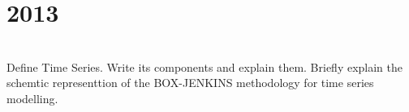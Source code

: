 \section*{2013}
\vspace{-.5cm}
\hrulefill \smallskip\\
 Define Time Series. Write its components and explain them.
\myline
{} Briefly explain the schemtic representtion of the BOX-JENKINS methodology for time series modelling.
